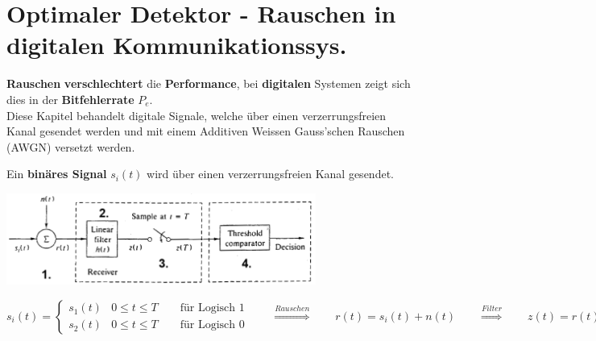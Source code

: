 \section{Optimaler Detektor - Rauschen in digitalen Kommunikationssys. }
\textbf{Rauschen} \textbf{verschlechtert} die \textbf{Performance}, bei \textbf{digitalen} Systemen zeigt sich dies in der
\textbf{Bitfehlerrate} $P_e$. \\
Diese Kapitel behandelt digitale Signale, welche über einen verzerrungsfreien Kanal gesendet werden
und mit einem Additiven Weissen Gauss'schen Rauschen (AWGN) versetzt werden. 

Ein \textbf{binäres Signal} $s_i(t)$  wird
über einen verzerrungsfreien Kanal gesendet. \\
\begin{center}
 	\includegraphics[height=3cm]{bilder/09_digital_signal_detection.png}
\end{center}

$$s_i(t) = \begin{cases}
          	s_1(t) & 0 \leq t \leq T \qquad \text{für Logisch } 1 \\
          	s_2(t) & 0 \leq t \leq T \qquad \text{für Logisch } 0          	
          \end{cases} 
				\qquad \overset{Rauschen}{\Longrightarrow} \qquad 
			r(t) = s_i(t) + n(t) 
				\qquad \overset{Filter}{\Longrightarrow} \qquad 
			z(t) = r(t) \ast h(t)$$ \\

